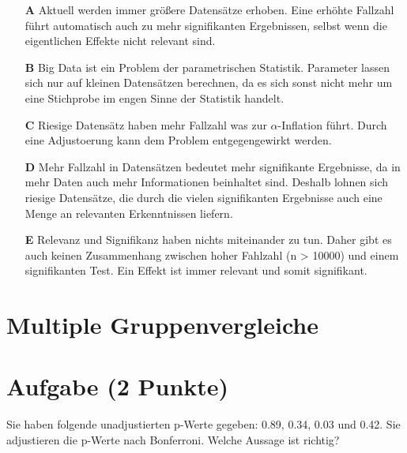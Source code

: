 \documentclass[a4paper, 9pt]{scrartcl}\usepackage[]{graphicx}\usepackage[]{xcolor}
\begin{document}
\begin{enumerate}
\item [\textbf{A} \msquare] Aktuell werden immer größere Datensätze erhoben. Eine erhöhte Fallzahl führt automatisch auch zu mehr signifikanten Ergebnissen, selbst wenn die eigentlichen Effekte nicht relevant sind.
\item [\textbf{B} \msquare] Big Data ist ein Problem der parametrischen Statistik. Parameter lassen sich nur auf kleinen Datensätzen berechnen, da es sich sonst nicht mehr um eine Stichprobe im engen Sinne der Statistik handelt.
\item [\textbf{C} \msquare] Riesige Datensätz haben mehr Fallzahl was zur $\alpha$-Inflation führt. Durch eine Adjustoerung kann dem Problem entgegengewirkt werden.
\item [\textbf{D} \msquare] Mehr Fallzahl in Datensätzen bedeutet mehr signifikante Ergebnisse, da in mehr Daten auch mehr Informationen beinhaltet sind. Deshalb lohnen sich riesige Datensätze, die durch die vielen signifikanten Ergebnisse auch eine Menge an relevanten Erkenntnissen liefern.
\item [\textbf{E} \msquare] Relevanz und Signifikanz haben nichts miteinander zu tun. Daher gibt es auch keinen Zusammenhang zwischen hoher Fahlzahl (n > 10000) und einem signifikanten Test. Ein Effekt ist immer relevant und somit signifikant.
\end{enumerate}
\section*{Multiple Gruppenvergleiche}    

\section{Aufgabe \hfill (2 Punkte)}



Sie haben folgende unadjustierten p-Werte gegeben: 0.89, 0.34, 0.03 und 0.42. Sie adjustieren die p-Werte nach
Bonferroni. Welche Aussage ist richtig?
\end{document}
